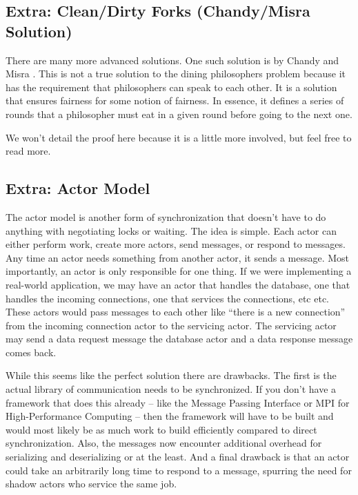 \subsection{Extra: Clean/Dirty Forks (Chandy/Misra Solution)}

There are many more advanced solutions.
One such solution is by Chandy and Misra \cite{Chandy:1984:DPP:1780.1804}.
This is not a true solution to the dining philosophers problem because it has the requirement that philosophers can speak to each other.
It is a solution that ensures fairness for some notion of fairness.
In essence, it defines a series of rounds that a philosopher must eat in a given round before going to the next one.

We won't detail the proof here because it is a little more involved, but feel free to read more.

\subsection{Extra: Actor Model}

The actor model is another form of synchronization that doesn't have to do anything with negotiating locks or waiting.
The idea is simple.
Each actor can either perform work, create more actors, send messages, or respond to messages.
Any time an actor needs something from another actor, it sends a message.
Most importantly, an actor is only responsible for one thing.
If we were implementing a real-world application, we may have an actor that handles the database, one that handles the incoming connections, one that services the connections, etc etc.
These actors would pass messages to each other like ``there is a new connection'' from the incoming connection actor to the servicing actor.
The servicing actor may send a data request message the database actor and a data response message comes back.

While this seems like the perfect solution there are drawbacks.
The first is the actual library of communication needs to be synchronized.
If you don't have a framework that does this already -- like the Message Passing Interface or MPI for High-Performance Computing -- then the framework will have to be built and would most likely be as much work to build efficiently compared to direct synchronization.
Also, the messages now encounter additional overhead for serializing and deserializing or at the least.
And a final drawback is that an actor could take an arbitrarily long time to respond to a message, spurring the need for shadow actors who service the same job.


